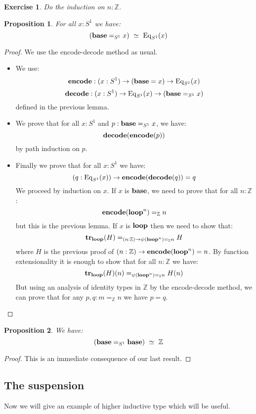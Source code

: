 \documentclass{article}
\newcommand{\encode}{\mathrm{\bf encode}}
\newcommand{\decode}{\mathrm{\bf decode}}
\newcommand{\sse}[1]{\medbreak \subsection{#1}}
\renewcommand{\r}{\rightarrow}
\newcommand{\refl}{\mathrm{refl}}
\newcommand{\tr}{\mathrm{\bf tr}}
\newcommand{\base}{\mathrm{\bf base}}
\renewcommand{\loop}{\mathrm{\bf loop}}
\newcommand{\Eq}{\mathrm{Eq}}
\newtheorem{proposition}{Proposition}
\newtheorem{exercise}{Exercise}
\begin{document}
\begin{exercise}
Do the induction on $n:\mathbb{Z}$.
\end{exercise}

\begin{proposition}
For all $x:S^1$ we have:
\[(\base=_{S^1}x) \ \simeq \ \Eq_{S^1}(x)\]
\end{proposition}
\begin{proof}
We use the encode-decode method as usual.
\begin{itemize}
\item We use:
\[\encode: (x:S^1)\r (\base=x)\r\Eq_{S^1}(x)\]
\[\decode : (x:S^1)\r \Eq_{S^1}(x)\r(\base=_{S^1}x)\] 
defined in the previous lemma.
\item We prove that for all $x:S^1$ and $p:\base=_{S^1}x$, we have:
\[\decode(\encode(p))\]
by path induction on $p$.
\item Finally we prove that for all $x:S^1$ we have:
\[(q:\Eq_{S^1}(x)) \r \encode(\decode(q)) = q\]
We proceed by induction on $x$.
\subitem If $x$ is $\base$, we need to prove that for all $n:\mathbb{Z}$:
\[\encode(\loop^n) =_{\mathbb{Z}} n \]
but this is the previous lemma.
\subitem If $x$ is $\loop$ then we need to show that:
\[\tr_\loop(H) =_{(n:\mathbb{Z}) \r \psi(\loop^n) =_{\mathbb{Z}} n} H\]
where $H$ is the previous proof of $(n:\mathbb{Z})\r \encode(\loop^n) = n$. By function extensionality it is enough to show that for all $n:\mathbb{Z}$ we have:
\[\tr_\loop(H)(n) =_{\psi(\loop^n) =_{\mathbb{Z}} n} H(n)\]
But using an analysis of identity types in $\mathbb{Z}$ by the encode-decode method, we can prove that for any $p,q:m=_{\mathbb{Z}} n$ we have $p=q$.
\end{itemize}
\end{proof}


\begin{proposition}
We have: 
\[(\base=_{S^1}\base) \ \simeq \ \mathbb{Z}\]
\end{proposition}
\begin{proof}
This is an immediate consequence of our last result.
\end{proof}


\sse{The suspension}

Now we will give an example of higher inductive type which will be useful. %
\end{document}
